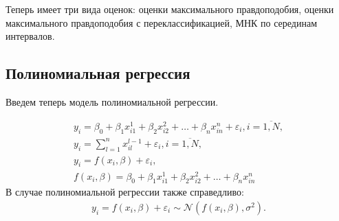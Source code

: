 Теперь имеет три вида оценок: оценки максимального правдоподобия, оценки максимального правдоподобия с переклассификацией, МНК по серединам интервалов. 
\newpage
\subsection{Полиномиальная регрессия}
Введем теперь модель полиномиальной регрессии.

\begin{equation}
    \begin{array}{c}
        \label{eq28}y_i=\beta_0+\beta_1 x_{i1}^1+\beta_2 x_{i2}^2+\dots+\beta_n x_{in}^n+\varepsilon_i, i=\overline{1,N},\\
        y_i = \sum\limits_{l=1}^{n} x_{il}^{l-1} + \varepsilon_i, i=\overline{1,N},\\
        y_i= f(x_i,\beta)+\varepsilon_i,\\
        f(x_i,\beta)=\beta_0+\beta_1 x_{i1}^1+\beta_2 x_{i2}^2+\dots+\beta_n x_{in}^n
    \end{array}
\end{equation}
В случае полиномиальной регрессии также справедливо:
\begin{eqnarray}
    y_i=f(x_i,\beta)+\varepsilon_i \sim \mathcal{N}(f(x_i,\beta),\sigma^2).
\end{eqnarray}

